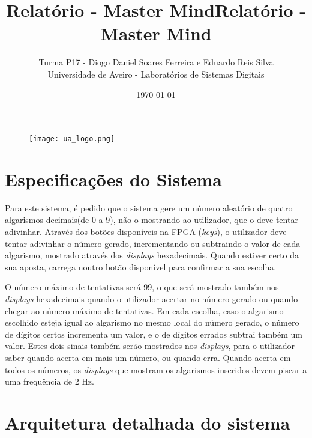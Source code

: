 \documentclass[11pt,openany,twoside]{report}
\title{\textbf{Relatório - Master Mind}}
\begin{document}
\begin{titlepage}
\begin{figure}
\title{\textbf{Relatório - Master Mind}}
\author{Turma P17 - Diogo Daniel Soares Ferreira e Eduardo Reis Silva\\\vspace{3cm}
Universidade de Aveiro - Laboratórios de Sistemas Digitais}
\date{\today}
 \texttt{[image: ua\_logo.png]}
\end{figure}
\end{titlepage}
\renewcommand\thesection{}

\maketitle
\tableofcontents

\section{Especificações do Sistema}

Para este sistema, é pedido que o sistema gere um número aleatório de quatro algarismos decimais(de 0 a 9), não o mostrando ao utilizador, que o deve tentar adivinhar. Através dos botões disponíveis na FPGA (\textit{keys}), o utilizador deve tentar adivinhar o número gerado, incrementando ou subtraindo o valor de cada algarismo, mostrado através dos \textit{displays} hexadecimais. Quando estiver certo da sua aposta, carrega noutro botão disponível para confirmar a sua escolha. 

O número máximo de tentativas será 99, o que será mostrado também nos \textit{displays} hexadecimais quando o utilizador acertar no número gerado ou quando chegar ao número máximo de tentativas. Em cada escolha, caso o algarismo escolhido esteja igual ao algarismo no mesmo local do número gerado, o número de dígitos certos incrementa um valor, e o de dígitos errados subtrai também um valor. Estes dois sinais também serão mostrados nos \textit{displays}, para o utilizador saber quando acerta em mais um número, ou quando erra. Quando acerta em todos os números, os \textit{displays} que mostram os algarismos inseridos devem piscar a uma frequência de 2 Hz.

\section{Arquitetura detalhada do sistema}
\end{document}

